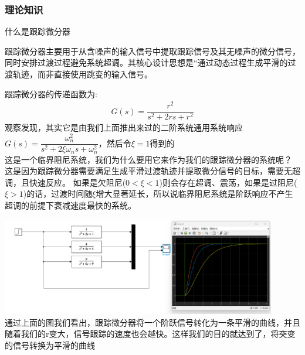 \documentclass[UTF8,a4paper,12pt]{ctexart}
\begin{document}
          \subsubsection{理论知识}
          
           \begin{titlebox}{什么是跟踪微分器}
            \begin{flushleft}
              跟踪微分器主要用于从含噪声的输入信号中提取跟踪信号及其无噪声的微分信号，同时安排过渡过程避免系统超调。其核心设计思想是“通过动态过程生成平滑的过渡轨迹，而非直接使用跳变的输入信号。
              
            \end{flushleft}
          \end{titlebox}
          \begin{flushleft}
            跟踪微分器的传递函数为:
            \begin{align*}
             G(s) = \dfrac{r^{2}}{s^2+2rs+r^{2}}
            \end{align*}
            观察发现，其实它是由我们上面推出来过的二阶系统通用系统响应$G(s)=\dfrac{\omega _{n}^{2}}{s^2+2\xi \omega _ns+\omega _{n}^{2}}$，然后令$\xi=1$得到的\\
              
            
            这是一个临界阻尼系统，我们为什么要用它来作为我们的跟踪微分器的系统呢？
            \\这是因为跟踪微分器需要满足生成平滑过渡轨迹并提取微分信号的目标，需要无超调，且快速反应。
            如果是欠阻尼($0<\xi<1$)则会存在超调、震荡，如果是过阻尼($\xi>1$)的话，过渡时间随$\xi$增大显著延长，所以说临界阻尼系统是阶跃响应不产生超调的前提下衰减速度最快的系统。
            \par \includegraphics[width=12cm]{picture/tracking_differentiator.png}\\
            通过上面的图我们看出，跟踪微分器将一个阶跃信号转化为一条平滑的曲线，并且随着我们的r变大，信号跟踪的速度也会越快。这样我们的目的就达到了，将突变的信号转换为平滑的曲线

          \end{flushleft}
\end{document}
